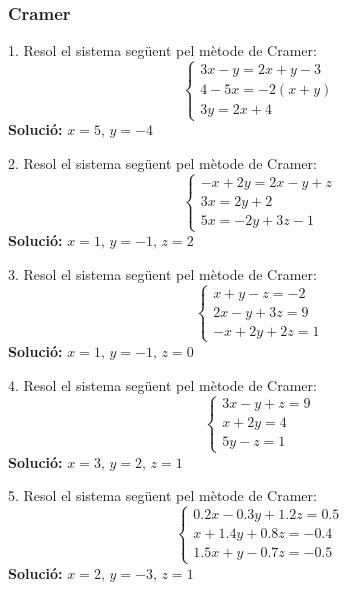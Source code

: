 \documentclass[12pt]{article}
\begin{document}
\subsubsection*{Cramer}

\begin{exercici}
1. Resol el sistema següent pel mètode de Cramer:
\[
\begin{cases}
3x - y = 2x + y - 3 \\
4 - 5x = -2(x + y) \\
3y = 2x + 4
\end{cases}
\]
\textbf{Solució:} \( x = 5, \, y = -4 \)
\end{exercici}

\begin{exercici}
2. Resol el sistema següent pel mètode de Cramer:
\[
\begin{cases}
-x + 2y = 2x - y + z \\
3x = 2y + 2 \\
5x = -2y + 3z - 1
\end{cases}
\]
\textbf{Solució:} \( x = 1, \, y = -1, \, z = 2 \)
\end{exercici}

\begin{exercici}
3. Resol el sistema següent pel mètode de Cramer:
\[
\begin{cases}
x + y - z = -2 \\
2x - y + 3z = 9 \\
-x + 2y + 2z = 1
\end{cases}
\]
\textbf{Solució:} \( x = 1, \, y = -1, \, z = 0 \)
\end{exercici}

\begin{exercici}
4. Resol el sistema següent pel mètode de Cramer:
\[
\begin{cases}
3x - y + z = 9 \\
x + 2y = 4 \\
5y - z = 1
\end{cases}
\]
\textbf{Solució:} \( x = 3, \, y = 2, \, z = 1 \)
\end{exercici}

\begin{exercici}
5. Resol el sistema següent pel mètode de Cramer:
\[
\begin{cases}
0.2x - 0.3y + 1.2z = 0.5 \\
x + 1.4y + 0.8z = -0.4 \\
1.5x + y - 0.7z = -0.5
\end{cases}
\]
\textbf{Solució:} \( x = 2, \, y = -3, \, z = 1 \)
\end{exercici}
\end{document}
